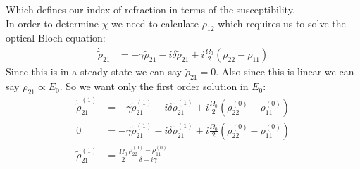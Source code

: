 Which defines our index of refraction in terms of the susceptibility. \\
In order to determine $\chi$ we need to calculate $\rho_{12}$ which requires us to solve the optical Bloch equation:
\begin{align*}
	\dot{\tilde{\rho}}_{21} &= -\gamma \tilde{\rho}_{21} -i\delta\tilde{\rho}_{21} + i\frac{\Omega_0}{2}(\rho_{22} - \rho_{11})
\end{align*}
Since this is in a steady state we can say $\tilde{\rho}_{21} = 0$. Also since this is linear we can say $\rho_{21} \propto E_0$. So we want only the first order solution in $E_0$:
\begin{align*}
	\dot{\tilde{\rho}}_{21}^{(1)} &= -\gamma \tilde{\rho}_{21}^{(1)} - i\delta\tilde{\rho}_{21}^{(1)} + i\frac{\Omega_0}{2}(\rho_{22}^{(0)} - \rho_{11}^{(0)}) \\
	0 &= -\gamma \tilde{\rho}_{21}^{(1)} - i\delta\tilde{\rho}_{21}^{(1)} + i\frac{\Omega_0}{2}(\rho_{22}^{(0)} - \rho_{11}^{(0)}) \\
	\tilde{\rho}_{21}^{(1)} &= \frac{\Omega_0}{2} \frac{\rho_{22}^{(0)} - \rho_{11}^{(0)}}{\delta - i\gamma}
\end{align*}
